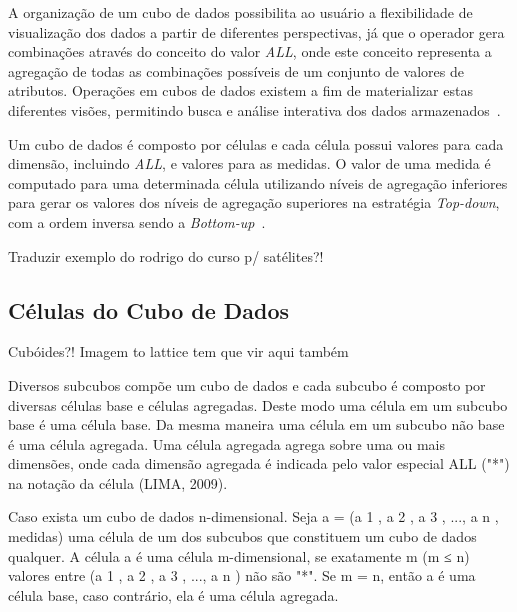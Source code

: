 A organização de um cubo de dados possibilita ao usuário a flexibilidade de visualização dos dados a partir de diferentes perspectivas, já que o operador gera combinações através do conceito do valor \textit{ALL}, onde este conceito representa a agregação de todas as combinações possíveis de um conjunto de valores de atributos.
Operações em cubos de dados existem a fim de materializar estas diferentes visões, permitindo busca e análise interativa dos dados armazenados~\cite{silva:2015:abordagensParaCubo}.

Um cubo de dados é composto por células e cada célula possui valores para cada dimensão, incluindo \textit{ALL}, e valores para as medidas.
O valor de uma medida é computado para uma determinada célula utilizando níveis de agregação inferiores para gerar os valores dos níveis de agregação superiores na estratégia \textit{Top-down}, com a ordem inversa sendo a \textit{Bottom-up}~\cite{silva:2015:abordagensParaCubo}.

{\color{red} Traduzir exemplo do rodrigo do curso p/ satélites?!}

\subsection{Células do Cubo de Dados}
\label{ch:fun:cube:cells}

{\color{red} Cubóides?! Imagem to lattice tem que vir aqui também}

Diversos subcubos compõe um cubo de dados e cada subcubo é composto por diversas células base e células agregadas.
Deste modo uma célula em um subcubo base é uma célula base.
Da mesma maneira uma célula em um subcubo não base é uma célula agregada.
Uma célula agregada agrega sobre uma ou mais dimensões, onde cada dimensão agregada é indicada pelo valor especial ALL ("*") na notação da célula (LIMA, 2009).

Caso exista um cubo de dados n-dimensional.
Seja a = (a 1 , a 2 , a 3 , ..., a n , medidas) uma célula de um dos subcubos que constituem um cubo de dados qualquer.
A célula a é uma célula m-dimensional, se exatamente m (m ≤ n) valores entre (a 1 , a 2 , a 3 , ..., a n ) não são "*".
Se m = n, então a é uma célula base, caso contrário, ela é uma célula agregada.

